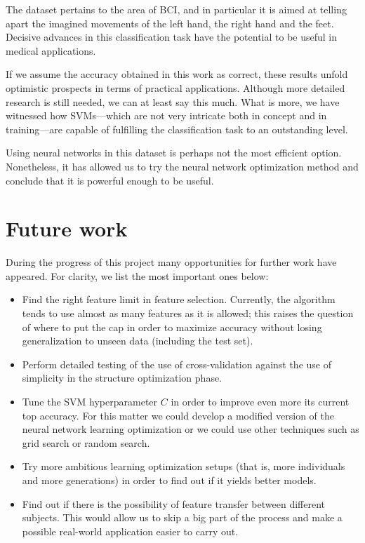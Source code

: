 		The dataset pertains to the area of \acs{BCI}, and in particular it is aimed at telling apart the imagined movements of the left hand, the right hand and the feet. Decisive advances in this classification task have the potential to be useful in medical applications.

		If we assume the accuracy obtained in this work as correct, these results unfold optimistic prospects in terms of practical applications. Although more detailed research is still needed, we can at least say this much. What is more, we have witnessed how \acs{SVM}s---which are not very intricate both in concept and in training---are capable of fulfilling the classification task to an outstanding level.

		Using neural networks in this dataset is perhaps not the most efficient option. Nonetheless, it has allowed us to try the neural network optimization method and conclude that it is powerful enough to be useful.

\section{Future work}

	During the progress of this project many opportunities for further work have appeared. For clarity, we list the most important ones below:

	\begin{itemize}

		\item
		Find the right feature limit in feature selection. Currently, the algorithm tends to use almost as many features as it is allowed; this raises the question of where to put the cap in order to maximize accuracy without losing generalization to unseen data (including the test set).

		\item
		Perform detailed testing of the use of cross-validation against the use of simplicity in the structure optimization phase.

		\item
		Tune the SVM hyperparameter $C$ in order to improve even more its current top accuracy. For this matter we could develop a modified version of the neural network learning optimization or we could use other techniques such as grid search or random search.

		\item
		Try more ambitious learning optimization setups (that is, more individuals and more generations) in order to find out if it yields better models.

		\item
		Find out if there is the possibility of feature transfer between different subjects. This would allow us to skip a big part of the process and make a possible real-world application easier to carry out.

	\end{itemize}

